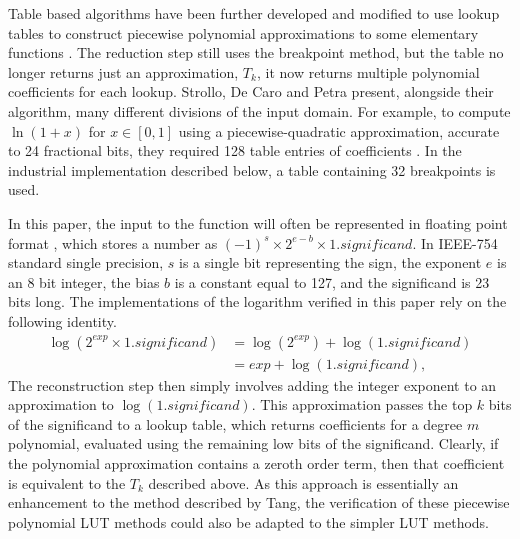 \documentclass{fac}
\begin{document}
Table based algorithms have been further developed and modified to use lookup tables to construct piecewise polynomial approximations to some elementary functions \cite{strollo2011elementary,pineiro2005high}. The reduction step still uses the breakpoint method, but the table no longer returns just an approximation, $T_k$, it now returns multiple polynomial coefficients for each lookup. Strollo, De Caro and Petra present, alongside their algorithm, many different divisions of the input domain. For example, to compute $\ln(1+x)$ for $x\in[0,1]$ using a piecewise-quadratic approximation, accurate to 24 fractional bits, they required 128 table entries of coefficients \cite{strollo2011elementary}. In the industrial implementation described below, a table containing 32 breakpoints is used. 

In this paper, the input to the function will often be represented in floating point format \cite{goldberg1991every}, which stores a number as $(-1)^{s} \times 2^{e-b} \times 1.\textit{significand}$. In IEEE-754 standard single precision, $s$ is a single bit representing the sign, the exponent $e$ is an 8 bit integer, the bias $b$ is a constant equal to 127, and the significand is 23 bits long. The implementations of the logarithm verified in this paper rely on the following identity.
\begin{align*}
    \log(2^{\textit{exp}} \times 1.\textit{significand}) &= \log(2^{\textit{exp}}) + \log(1.\textit{significand}) \\
                                                &= \textit{exp} + \log(1.\textit{significand}),
\end{align*}
The reconstruction step then simply involves adding the integer exponent to an approximation to $\log(1.\textit{significand})$. This approximation passes the top $k$ bits of the significand to a lookup table, which returns coefficients for a degree $m$ polynomial, evaluated using the remaining low bits of the significand. Clearly, if the polynomial approximation contains a zeroth order term, then that coefficient is equivalent to the $T_k$ described above. As this approach is essentially an enhancement to the method described by Tang, the verification of these piecewise polynomial LUT methods could also be adapted to the simpler LUT methods.


\end{document}
